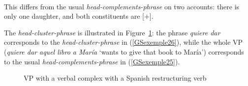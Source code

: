 \ea
{}%
 \impl \\
\label{GSexemple26}
\z

\noindent
This differs from the usual \emph{head-complements-phrase} on two accounts: there is only one daughter, and both constituents are [\light{}$+$]. 

The \emph{head-cluster-phrase} is illustrated in Figure~\ref{GSfigure5}: the phrase \emph{quiere dar} corresponds to the \emph{head-cluster-phrase} in (\ref{GSexemple26}), while the whole VP (\emph{quiere dar aquel libro a Mar\'ia} `wants to give that book to Mar\'ia') corresponds to the usual \emph{head-complements-phrase} in (\ref{GSexemple25}).


\begin{figure}
    \centering
{}
\caption{VP with a verbal complex with a Spanish restructuring verb}
    \label{GSfigure5}
\end{figure}


